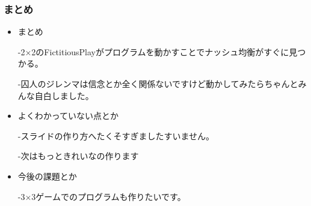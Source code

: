 \documentclass[dvipdfmx,fleqn,handout]{beamer}
\begin{document}
\begin{frame}
\frametitle{まとめ}
\begin{itemize}\setlength{\parskip}{0.5em}
\item
まとめ

-2×2のFictitiousPlayがプログラムを動かすことでナッシュ均衡がすぐに見つかる。

-囚人のジレンマは信念とか全く関係ないですけど動かしてみたらちゃんとみんな自白しました。
\item
よくわかっていない点とか

-スライドの作り方へたくそすぎましたすいません。

-次はもっときれいなの作ります

\item
今後の課題とか

-3×3ゲームでのプログラムも作りたいです。
\end{itemize}
\end{frame}
\end{document}
